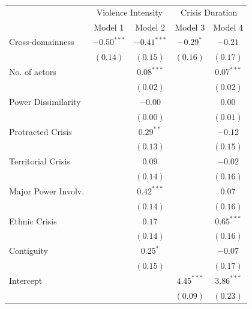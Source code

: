 \documentclass[
]{article}
\begin{document}
\begin{table}[h!]
\begin{center}
\begin{tabular}{l c c c c}
\hline
 & \multicolumn{2}{c}{Violence Intensity} & \multicolumn{2}{c}{Crisis Duration} \\
\cline{2-3} \cline{4-5}
 & Model 1 & Model 2 & Model 3 & Model 4 \\
\hline
Cross-domainness    & $-0.50^{***}$ & $-0.41^{***}$ & $-0.29^{*}$  & $-0.21$      \\
                    & $(0.14)$      & $(0.15)$      & $(0.16)$     & $(0.17)$     \\
No. of actors       &               & $0.08^{***}$  &              & $0.07^{***}$ \\
                    &               & $(0.02)$      &              & $(0.02)$     \\
Power Dissimilarity &               & $-0.00$       &              & $0.00$       \\
                    &               & $(0.00)$      &              & $(0.01)$     \\
Protracted Crisis   &               & $0.29^{**}$   &              & $-0.12$      \\
                    &               & $(0.13)$      &              & $(0.15)$     \\
Territorial Crisis  &               & $0.09$        &              & $-0.02$      \\
                    &               & $(0.14)$      &              & $(0.16)$     \\
Major Power Involv. &               & $0.42^{***}$  &              & $0.07$       \\
                    &               & $(0.14)$      &              & $(0.16)$     \\
Ethnic Crisis       &               & $0.17$        &              & $0.65^{***}$ \\
                    &               & $(0.14)$      &              & $(0.16)$     \\
Contiguity          &               & $0.25^{*}$    &              & $-0.07$      \\
                    &               & $(0.15)$      &              & $(0.17)$     \\
Intercept           &               &               & $4.45^{***}$ & $3.86^{***}$ \\
                    &               &               & $(0.09)$     & $(0.23)$     \\

\end{tabular}
\end{center}
\end{table}
\end{document}
